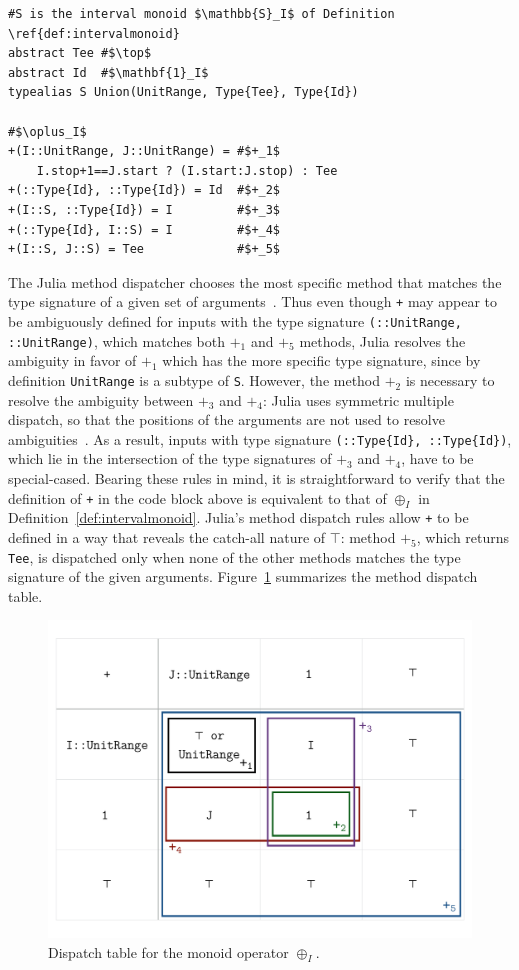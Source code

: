 \documentclass{sig-alternate}
\newcommand{\code}[1]{\texttt{#1}}
\begin{document}
\begin{verbatim}
#S is the interval monoid $\mathbb{S}_I$ of Definition \ref{def:intervalmonoid}
abstract Tee #$\top$
abstract Id  #$\mathbf{1}_I$
typealias S Union(UnitRange, Type{Tee}, Type{Id})

#$\oplus_I$
+(I::UnitRange, J::UnitRange) = #$+_1$ 
    I.stop+1==J.start ? (I.start:J.stop) : Tee
+(::Type{Id}, ::Type{Id}) = Id  #$+_2$
+(I::S, ::Type{Id}) = I         #$+_3$
+(::Type{Id}, I::S) = I         #$+_4$
+(I::S, J::S) = Tee             #$+_5$
\end{verbatim}

The Julia method dispatcher chooses the most specific method that matches the
type signature of a given set of arguments~\cite{Bezanson2012}. Thus even
though \code{+} may appear to be ambiguously defined for inputs with the type
signature \code{(::Unit\-Range, ::UnitRange)}, which matches both $+_1$ and $+_5$
methods, Julia resolves the ambiguity in favor of $+_1$ which has the more
specific type signature, since by definition \code{UnitRange} is a subtype of
\code{S}. However, the method $+_2$ is necessary to resolve the ambiguity
between $+_3$ and $+_4$: Julia uses symmetric multiple dispatch, so that the
positions of the arguments are not used to resolve
ambiguities~\cite{Bezanson2012}. As a result, inputs with type signature
\code{(::Type\{Id\}, ::Type\{Id\})}, which lie in the intersection of the type
signatures of $+_3$ and $+_4$, have to be special-cased. Bearing these rules in
mind, it is straightforward to verify that the definition of \code{+} in the
code block above is equivalent to that of $\oplus_I$ in
Definition~\ref{def:intervalmonoid}. Julia's method dispatch rules allow
\code{+} to be defined in a way that reveals the catch-all nature of $\top$:
method $+_5$, which returns \code{Tee}, is dispatched only when none of the
other methods matches the type signature of the given arguments.
Figure~\ref{fig:dispatch} summarizes the method dispatch table.

\begin{figure}
  \centering

  \includegraphics[width=.9\columnwidth]{intervaldispatch}
  \caption{Dispatch table for the monoid operator $\oplus_I$.}
   \label{fig:dispatch}
\end{figure}
\end{document}
